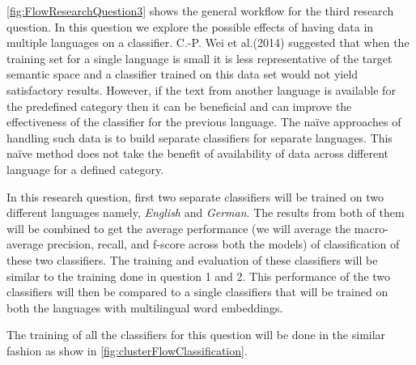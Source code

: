\ref{fig:FlowResearchQuestion3} shows the general workflow for the third research question. In this question we explore the possible effects of having data in multiple languages on a classifier. C.-P. Wei et al.(2014)\cite{Wei:2014:EPD:2566999.2567111} suggested that when the training set for a single language is small it is less representative of the target semantic space and a classifier trained on this data set would not yield satisfactory results. However, if the text from another language is available for the predefined category then it can be beneficial and can improve the effectiveness of the classifier for the previous language. The naïve approaches of handling such data is to build separate classifiers for separate languages. This naïve method does not take the benefit of availability of data across different language for a defined category. 

In this research question, first two separate classifiers will be trained on two different languages namely, \textit{English} and \textit{German}. The results from both of them will be combined to get the average performance (we will average the macro-average precision, recall, and f-score across both the models) of classification of these two classifiers. The training and evaluation of these classifiers will be similar to the training done in question 1 and 2. This performance of the two classifiers will then be compared to a single classifiers that will be trained on both the languages with multilingual word embeddings.

The training of all the classifiers for this question will be done in the similar fashion as show in \ref{fig:clusterFlowClassification}.


